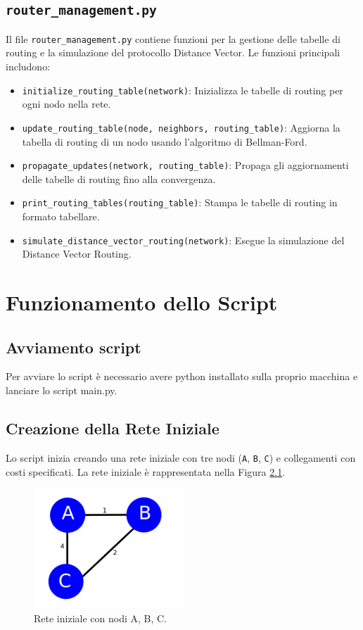 \documentclass{report}
\begin{document}
\section{\texttt{router\_management.py}}
Il file \texttt{router\_management.py} contiene funzioni per la gestione delle tabelle di routing e la simulazione del protocollo Distance Vector. Le funzioni principali includono:
\begin{itemize}
    \item \texttt{initialize\_routing\_table(network)}: Inizializza le tabelle di routing per ogni nodo nella rete.
    \item \texttt{update\_routing\_table(node, neighbors, routing\_table)}: Aggiorna la tabella di routing di un nodo usando l'algoritmo di Bellman-Ford.
    \item \texttt{propagate\_updates(network, routing\_table)}: Propaga gli aggiornamenti delle tabelle di routing fino alla convergenza.
    \item \texttt{print\_routing\_tables(routing\_table)}: Stampa le tabelle di routing in formato tabellare.
    \item \texttt{simulate\_distance\_vector\_routing(network)}: Esegue la simulazione del Distance Vector Routing.
\end{itemize}

\chapter{Funzionamento dello Script}

\section{Avviamento script}
Per avviare lo script è necessario avere python installato sulla proprio macchina e lanciare lo script main.py.

\section{Creazione della Rete Iniziale}
Lo script inizia creando una rete iniziale con tre nodi (\texttt{A}, \texttt{B}, \texttt{C}) e collegamenti con costi specificati. La rete iniziale è rappresentata nella Figura \ref{fig:initial_network}.

\begin{figure}[H]
    \centering
    \includegraphics[width=0.5\textwidth]{img/img1.png}
    \caption{Rete iniziale con nodi A, B, C.}
    \label{fig:initial_network}
\end{figure}
\end{document}
